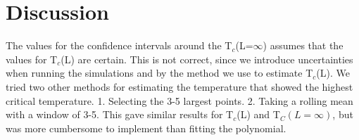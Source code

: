 \section{Discussion}

The values for the confidence intervals around the T$_c$(L=$\infty$) assumes
that the values for T$_c$(L) are certain. This is not correct, since we
introduce uncertainties when running the simulations and by the method we use to
estimate T$_c$(L). We tried two other methods for estimating the temperature
that showed the highest critical temperature. 1. Selecting the 3-5 largest
points. 2. Taking a rolling mean with a window of 3-5. This gave similar results
for T$_c$(L) and T$_C(L=\infty)$, but was more cumbersome to implement than
fitting the polynomial.
